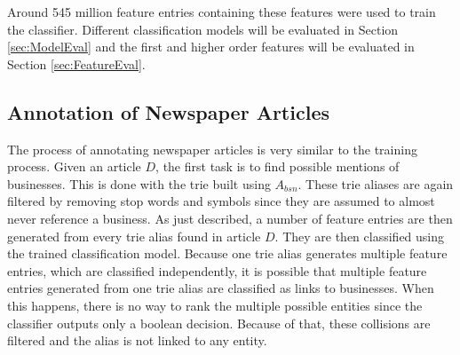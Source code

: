 Around 545 million feature entries containing these features were used to train the classifier. Different classification models will be evaluated in Section \ref{sec:ModelEval} and the first and higher order features will be evaluated in Section \ref{sec:FeatureEval}.

\subsection{Annotation of Newspaper Articles}
The process of annotating newspaper articles is very similar to the training process. Given an article $D$, the first task is to find possible mentions of businesses. This is done with the trie built using $A_{bsn}$. These trie aliases are again filtered by removing stop words and symbols since they are assumed to almost never reference a business. As just described, a number of feature entries are then generated from every trie alias found in article $D$. They are then classified using the trained classification model. Because one trie alias generates multiple feature entries, which are classified independently, it is possible that multiple feature entries generated from one trie alias are classified as links to businesses. When this happens, there is no way to rank the multiple possible entities since the classifier outputs only a boolean decision. Because of that, these collisions are filtered and the alias is not linked to any entity.

